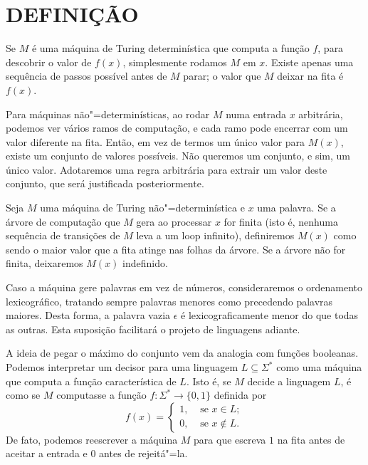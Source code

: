 \section{DEFINIÇÃO}

Se $M$ é uma máquina de Turing determinística que computa a função $f$,
para descobrir o valor de $f(x)$,
simplesmente rodamos $M$ em $x$.
Existe apenas uma sequência de passos possível antes de $M$ parar;
o valor que $M$ deixar na fita é $f(x)$.

Para máquinas não"=determinísticas,
ao rodar $M$ numa entrada $x$ arbitrária,
podemos ver vários ramos de computação,
e cada ramo pode encerrar com um valor diferente na fita.
Então, em vez de termos um único valor para $M(x)$,
existe um conjunto de valores possíveis.
Não queremos um conjunto, e sim, um único valor.
Adotaremos uma regra arbitrária para extrair um valor deste conjunto,
que será justificada posteriormente.

\begin{definition}[Função não"=determinística\footnotemark]
    \label{def:nondeterministic_function}
    Seja $M$
    uma máquina de Turing não"=determinística
    e $x$ uma palavra.
    Se a árvore de computação que $M$ gera ao processar $x$ for finita
    (isto é, nenhuma sequência de transições de $M$ leva a um loop infinito),
    definiremos $M(x)$ como sendo o maior valor que a fita atinge
    nas folhas da árvore.
    Se a árvore não for finita, deixaremos $M(x)$ indefinido.

    Caso a máquina gere palavras em vez de números,
    consideraremos o ordenamento lexicográfico,
    tratando sempre palavras menores como precedendo palavras maiores.
    Desta forma, a palavra vazia $\epsilon$
    é lexicograficamente menor do que todas as outras.
    Esta suposição facilitará o projeto de linguagens adiante.
\end{definition}

A ideia de pegar o máximo do conjunto vem da analogia com funções booleanas.
Podemos interpretar um decisor para uma linguagem $L \subseteq \Sigma^*$
como uma máquina que computa a função característica de $L$.
Isto é,
se $M$ decide a linguagem $L$,
é como se $M$ computasse a função $f : \Sigma^* \rightarrow \{0, 1\}$
definida por
\begin{equation*}
    f(x) =
    \begin{cases}
        1,& \text{ se } x \in L; \\
        0,& \text{ se } x \notin L.
    \end{cases}
\end{equation*}
De fato, podemos reescrever a máquina $M$
para que escreva $1$ na fita antes de aceitar a entrada
e $0$ antes de rejeitá"=la.

